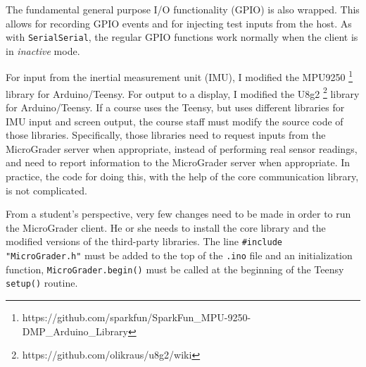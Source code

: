 \documentclass[12pt]{article}
\begin{document}
The fundamental general purpose I/O functionality (GPIO) is also wrapped.  This allows for recording GPIO events and for injecting test inputs from the host.  As with \texttt{Serial}\texttt{Serial}, the regular GPIO functions work normally when the client is in \textit{inactive} mode. 

For input from the inertial measurement unit (IMU), I modified the MPU9250 \footnote{https://github.com/sparkfun/SparkFun\_MPU-9250-DMP\_Arduino\_Library} library for Arduino/Teensy.  For output to a display, I modified the U8g2 \footnote{https://github.com/olikraus/u8g2/wiki} library for Arduino/Teensy.  If a course uses the Teensy, but uses different libraries for IMU input and screen output, the course staff must modify the source code of those libraries.  Specifically, those libraries need to request inputs from the MicroGrader server when appropriate, instead of performing real sensor readings, and need to report information to the MicroGrader server when appropriate.  In practice, the code for doing this, with the help of the core communication library, is not complicated.

From a student's perspective, very few changes need to be made in order to run the MicroGrader client.  He or she needs to install the core library and the modified versions of the third-party libraries.  The line \verb+#include "MicroGrader.h"+ must be added to the top of the \texttt{.ino} file and an initialization function, \texttt{MicroGrader.begin()} must be called at the beginning of the Teensy \texttt{setup()} routine.
\end{document}
